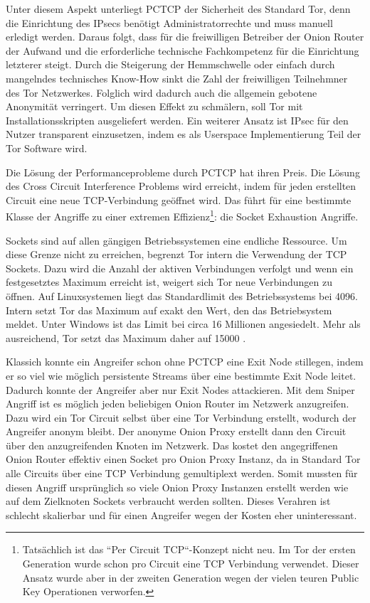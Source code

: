 \documentclass[fleqn,envcountsame,runningheads,10pt,a4paper]{llncs}
\begin{document}
Unter diesem Aspekt unterliegt PCTCP der Sicherheit des Standard Tor, denn die 
Einrichtung des IPsecs benötigt Administratorrechte und muss manuell erledigt 
werden. Daraus folgt, dass für die freiwilligen Betreiber der Onion Router der 
Aufwand und die erforderliche technische Fachkompetenz für die Einrichtung 
letzterer steigt. Durch die Steigerung der Hemmschwelle oder einfach durch 
mangelndes technisches Know-How sinkt die Zahl der freiwilligen Teilnehmner des 
Tor Netzwerkes. Folglich wird dadurch auch die allgemein gebotene Anonymität 
verringert. Um diesen Effekt zu schmälern, soll Tor mit Installationsskripten 
ausgeliefert werden. Ein weiterer Ansatz ist IPsec für den Nutzer transparent 
einzusetzen, indem es als Userspace Implementierung Teil der Tor Software wird.

Die Lösung der Performanceprobleme durch PCTCP hat ihren Preis. Die Lösung 
des Cross Circuit Interference Problems wird erreicht, indem für jeden 
erstellten Circuit eine neue TCP-Verbindung geöffnet wird. Das führt für eine 
bestimmte Klasse der Angriffe zu einer extremen Effizienz\footnote{Tatsächlich 
ist das ``Per Circuit TCP``-Konzept nicht neu. Im Tor der ersten Generation 
wurde schon pro Circuit eine TCP Verbindung verwendet. Dieser Ansatz wurde aber 
in der zweiten Generation wegen der vielen teuren Public Key Operationen 
verworfen.\cite{tor}}: die Socket Exhaustion Angriffe. 

Sockets sind auf allen gängigen Betriebssystemen eine endliche Ressource. Um 
diese Grenze nicht zu erreichen, begrenzt Tor intern die Verwendung der TCP 
Sockets. Dazu wird die Anzahl der aktiven Verbindungen verfolgt und wenn ein 
festgesetztes Maximum erreicht ist, weigert sich Tor neue Verbindungen zu öffnen. 
Auf Linuxsystemen liegt das Standardlimit des Betriebssystems bei 4096. Intern 
setzt Tor das Maximum auf exakt den Wert, den das Betriebsystem meldet. Unter 
Windows ist das Limit bei circa 16 Millionen angesiedelt. Mehr als ausreichend,
Tor setzt das Maximum daher auf 15000 \cite{imux}.

Klassich konnte ein Angreifer schon ohne PCTCP eine Exit Node stillegen, indem 
er so viel wie möglich persistente Streams über eine bestimmte Exit Node 
leitet. Dadurch konnte der Angreifer aber nur Exit Nodes attackieren. Mit dem 
Sniper Angriff \cite{sniper} ist es möglich jeden beliebigen Onion Router im 
Netzwerk anzugreifen. Dazu wird ein Tor Circuit selbst über eine Tor Verbindung 
erstellt, wodurch der Angreifer anonym bleibt. Der anonyme Onion Proxy erstellt 
dann den Circuit über den anzugreifenden Knoten im Netzwerk. Das kostet den 
angegriffenen Onion Router effektiv einen Socket pro Onion Proxy Instanz, da in 
Standard Tor alle Circuits über eine TCP Verbindung gemultiplext werden. Somit 
mussten für diesen Angriff ursprünglich so viele Onion Proxy Instanzen erstellt 
werden wie auf dem Zielknoten Sockets verbraucht werden sollten. Dieses 
Verahren ist schlecht skalierbar und für einen Angreifer wegen der Kosten eher 
uninteressant.
\end{document}
